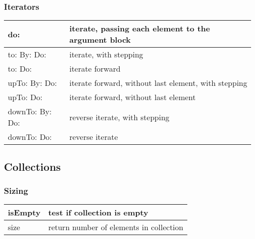 \documentclass[letterpaper,10pt,english]{sphinxmanual}
\begin{document}
\subsubsection{Iterators}
\label{\detokenize{usefulselectors:iterators}}
\noindent\begin{tabulary}{\linewidth}{p{5cm} p{10cm}}
\hline

do:
&
iterate, passing each element to the argument block
\\
\hline
to: By: Do:
&
iterate, with stepping
\\
\hline
to: Do:
&
iterate forward
\\
\hline
upTo: By: Do:
&
iterate forward, without last element, with stepping
\\
\hline
upTo: Do:
&
iterate forward, without last element
\\
\hline
downTo: By: Do:
&
reverse iterate, with stepping
\\
\hline
downTo: Do:
&
reverse iterate
\\
\hline\end{tabulary}



\subsection{Collections}
\label{\detokenize{usefulselectors:collections}}

\subsubsection{Sizing}
\label{\detokenize{usefulselectors:sizing}}
\noindent\begin{tabulary}{\linewidth}{p{5cm} p{10cm}}
\hline

isEmpty
&
test if collection is empty
\\
\hline
size
&
return number of elements in collection
\\
\hline\end{tabulary}
\end{document}
